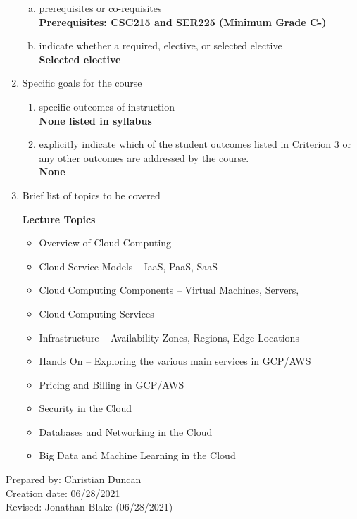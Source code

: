 \begin{enumerate}[1.]
\begin{enumerate}[a.]
\item prerequisites or co-requisites\\
  {\bfseries
    Prerequisites: CSC215 and SER225 (Minimum Grade C-)
  }

\item indicate whether a required, elective, or selected elective\\ %
  {\bfseries
    Selected elective
  }

\end{enumerate}

\item Specific goals for the course
\begin{enumerate}
\item specific outcomes of instruction\\ %
  {\bfseries
    None listed in syllabus
  }

\item explicitly indicate which of the student outcomes listed in Criterion 3 or any other outcomes are addressed by the course.\\
  {\bfseries
    None
  }
\end{enumerate}

\item Brief list of topics to be covered\\
  {\bfseries
    Lecture Topics
    \begin{itemize}
      \item Overview of Cloud Computing
      \item Cloud Service Models – IaaS, PaaS, SaaS
      \item Cloud Computing Components – Virtual Machines, Servers,
      \item Cloud Computing Services
      \item Infrastructure – Availability Zones, Regions, Edge Locations
      \item Hands On – Exploring the various main services in GCP/AWS
      \item Pricing and Billing in GCP/AWS
      \item Security in the Cloud
      \item Databases and Networking in the Cloud
      \item Big Data and Machine Learning in the Cloud
    \end{itemize}
  }

\end{enumerate}

\noindent Prepared by: Christian Duncan\\
\noindent Creation date: 06/28/2021\\
\noindent Revised: Jonathan Blake (06/28/2021)\\
